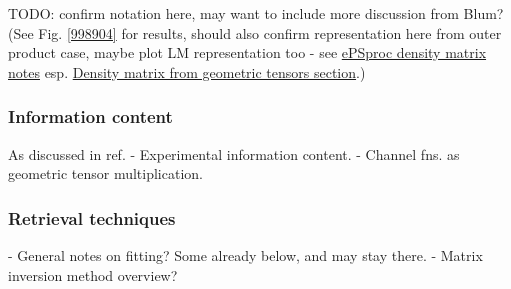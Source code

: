 TODO: confirm notation here, may want to include more discussion from Blum? (See Fig. \ref{998904} for results, should also confirm representation here from outer product case, maybe plot LM representation too - see \href{https://epsproc.readthedocs.io/en/dev/methods/density_mat_notes_demo_300821.html}{ePSproc density matrix notes} esp. \href{https://epsproc.readthedocs.io/en/dev/methods/density_mat_notes_demo_300821.html#Density-matrix-from-geometric-tensors}{Density matrix from geometric tensors section}.)


\subsubsection{Information content}










As discussed in ref. \cite{hockett2018QMP2}
- Experimental information content.
- Channel fns. as geometric tensor multiplication.


\subsubsection{Retrieval techniques}

- General notes on fitting? Some already below, and may stay there.
- Matrix inversion method overview?
